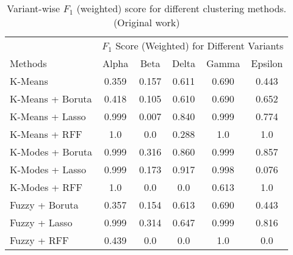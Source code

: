 \documentclass[%
 aip,
 jmp,%
 amsmath,amssymb,
 reprint,%
]{revtex4-2}
\begin{document}
\begin{table}
    \centering
    \caption{Variant-wise $F_1$ (weighted) score for different clustering methods. (Original work)}
    \begin{tabular}{lccccc}
        \toprule
        & \multicolumn{5}{c}{$F_1$ Score (Weighted) for Different Variants}\\
        \cmidrule{2-6}
        Methods & Alpha & Beta & Delta & Gamma & Epsilon \\
        \midrule
        \midrule
        K-Means            & 0.359 & 0.157 & 0.611 & 0.690 & 0.443\\
        K-Means + Boruta   & 0.418 & 0.105 & 0.610 & 0.690 & 0.652\\
        K-Means + Lasso    & 0.999 & 0.007 & 0.840 & 0.999 & 0.774\\ 
        K-Means + RFF      & 1.0 & 0.0 & 0.288 & 1.0 & 1.0\\ 
        \midrule
        K-Modes + Boruta   & 0.999 & 0.316 & 0.860 & 0.999 & 0.857\\
        K-Modes + Lasso    & 0.999 & 0.173 & 0.917 & 0.998 & 0.076\\ 
        K-Modes + RFF      & 1.0 & 0.0 & 0.0 & 0.613 & 1.0\\ 
        \midrule
        Fuzzy + Boruta   & 0.357 & 0.154 & 0.613 & 0.690 & 0.443\\
        Fuzzy + Lasso    & 0.999 & 0.314 & 0.647 & 0.999 & 0.816\\ 
        Fuzzy + RFF      & 0.439 & 0.0 & 0.0 & 1.0 & 0.0\\ 
        \bottomrule
    \end{tabular}
    \label{tab:tab2}
\end{table}
\end{document}
